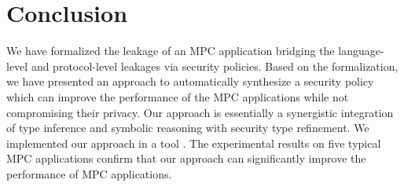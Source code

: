 
\section{Conclusion}\label{sec:conclusion}
We have formalized the leakage of an MPC application %
bridging the language-level and protocol-level leakages
via security policies. Based on the formalization,
we have presented an approach to automatically synthesize a security policy
which can improve the performance of the MPC applications while not compromising their privacy.
Our approach is essentially a synergistic integration of type inference and
symbolic reasoning with security type refinement.
We implemented our approach in a tool \TNAME.
The experimental results on five typical MPC applications confirm
that our approach can significantly improve
the performance of MPC applications.

